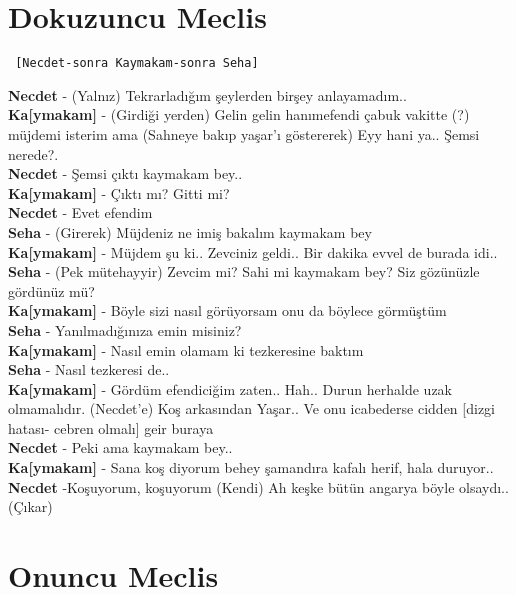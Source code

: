 \documentclass[]{book}
\begin{document}
\hypertarget{dokuzuncu-meclis-2}{%
\section{Dokuzuncu Meclis}\label{dokuzuncu-meclis-2}}

\begin{verbatim}
 [Necdet-sonra Kaymakam-sonra Seha]
\end{verbatim}

\textbf{Necdet} - (Yalnız) Tekrarladığım şeylerden birşey anlayamadım..\\
\textbf{Ka{[}ymakam{]}} - (Girdiği yerden) Gelin gelin hanımefendi çabuk vakitte (?) müjdemi isterim ama (Sahneye bakıp yaşar'ı göstererek) Eyy hani ya.. Şemsi nerede?.\\
\textbf{Necdet} - Şemsi çıktı kaymakam bey..\\
\textbf{Ka{[}ymakam{]}} - Çıktı mı? Gitti mi?\\
\textbf{Necdet} - Evet efendim\\
\textbf{Seha} - (Girerek) Müjdeniz ne imiş bakalım kaymakam bey\\
\textbf{Ka{[}ymakam{]}} - Müjdem şu ki.. Zevciniz geldi.. Bir dakika evvel de burada idi..\\
\textbf{Seha} - (Pek mütehayyir) Zevcim mi? Sahi mi kaymakam bey? Siz gözünüzle gördünüz mü?\\
\textbf{Ka{[}ymakam{]}} - Böyle sizi nasıl görüyorsam onu da böylece görmüştüm\\
\textbf{Seha} - Yanılmadığınıza emin misiniz?\\
\textbf{Ka{[}ymakam{]}} - Nasıl emin olamam ki tezkeresine baktım\\
\textbf{Seha} - Nasıl tezkeresi de..\\
\textbf{Ka{[}ymakam{]}} - Gördüm efendiciğim zaten.. Hah.. Durun herhalde uzak olmamalıdır. (Necdet'e) Koş arkasından Yaşar.. Ve onu icabederse cidden {[}dizgi hatası- cebren olmalı{]} geir buraya\\
\textbf{Necdet} - Peki ama kaymakam bey..\\
\textbf{Ka{[}ymakam{]}} - Sana koş diyorum behey şamandıra kafalı herif, hala duruyor..\\
\textbf{Necdet} -Koşuyorum, koşuyorum (Kendi) Ah keşke bütün angarya böyle olsaydı.. (Çıkar)\\

\hypertarget{onuncu-meclis-1}{%
\section{Onuncu Meclis}\label{onuncu-meclis-1}}
\end{document}
